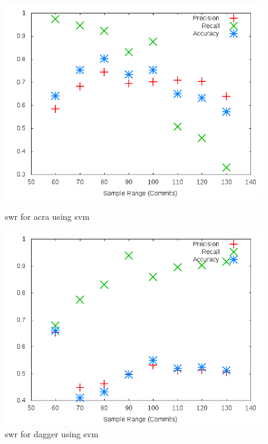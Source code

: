 \begin{figure}[h]
    \centering

    \begin{minipage}[b]{0.45\linewidth}
        \includegraphics[width=1.0\textwidth]{images/svm/test_1/acra_sample_range}
        \caption{\gls{swr} for acra using \gls{svm}}
        \label{fig:test_1_acra_svm}
    \end{minipage}
\quad
    \begin{minipage}[b]{0.45\linewidth}
        \includegraphics[width=1.0\textwidth]{images/svm/test_1/dagger_sample_range}
        \caption{\gls{swr} for dagger using \gls{svm}}
        \label{fig:test_1_dagger_svm}
    \end{minipage}
\end{figure}

